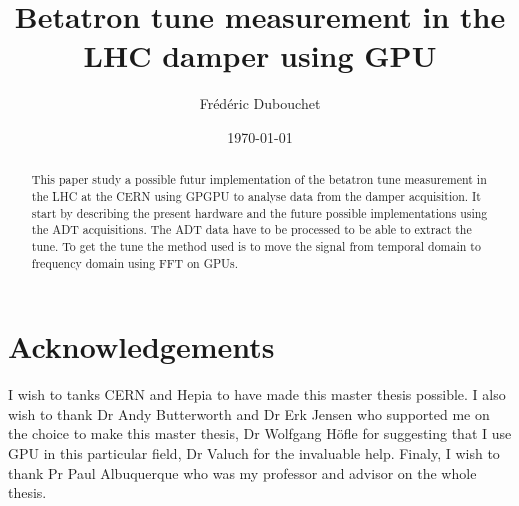 \documentclass[a4paper]{report}
\title{Betatron tune measurement in the LHC damper using GPU}
\author{Fr\'ed\'eric Dubouchet}
\date{\today}
\begin{document}
\maketitle

\begin{abstract}
	This paper study a possible futur implementation of the betatron tune measurement in the \gls{LHC} at the \gls{CERN} using \gls{GPGPU} to analyse data from the \gls{damper} acquisition. It start by describing the present hardware and the future possible implementations using the \gls{ADT} acquisitions. The \gls{ADT} data have to be processed to be able to extract the \gls{tune}. To get the tune the method used is to move the signal from temporal domain to frequency domain using \gls{FFT} on \glspl{GPU}.
\end{abstract}

\chapter*{Acknowledgements}
	I wish to tanks \gls{CERN} and \gls{Hepia} to have made this master thesis possible. I also wish to thank Dr Andy Butterworth and Dr Erk Jensen who supported me on the choice to make this master thesis, Dr Wolfgang H{\"o}fle for suggesting that I use GPU in this particular field, Dr Valuch for the invaluable help. Finaly, I wish to thank Pr Paul Albuquerque who was my professor and advisor on the whole thesis.

\tableofcontents
\listoffigures
\listoftables







\printglossaries


\end{document}

